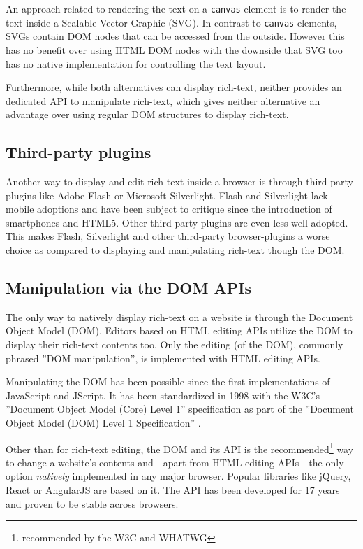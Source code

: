 An approach related to rendering the text on a \texttt{canvas} element is to render the text inside a Scalable Vector Graphic (SVG). In contrast to \texttt{canvas} elements, SVGs contain DOM nodes that can be accessed from the outside. However this has no benefit over using HTML DOM nodes with the downside that SVG too has no native implementation for controlling the text layout.

Furthermore, while both alternatives can display rich-text, neither provides an dedicated API to manipulate rich-text, which gives neither alternative an advantage over using regular DOM structures to display rich-text.

\subsection{Third-party plugins}

Another way to display and edit rich-text inside a browser is through third-party plugins like Adobe Flash or Microsoft Silverlight. Flash and Silverlight lack mobile adoptions and have been subject to critique since the introduction of smartphones and HTML5. Other third-party plugins are even less well adopted. This makes Flash, Silverlight and other third-party browser-plugins a worse choice as compared to displaying and manipulating rich-text though the DOM.

\subsection{Manipulation via the DOM APIs}
\label{subsec:manip_via_dom}

The only way to natively display rich-text on a website is through the Document Object Model (DOM). Editors based on HTML editing APIs utilize the DOM to display their rich-text contents too. Only the editing (of the DOM), commonly phrased ''DOM manipulation'', is implemented with HTML editing APIs.


Manipulating the DOM has been possible since the first implementations of JavaScript and JScript. It has been standardized in 1998 with the W3C's ''Document Object Model (Core) Level 1'' specification as part of the ''Document Object Model (DOM) Level 1 Specification'' \cite{DOM1}.


Other than for rich-text editing, the DOM and its API is the recommended\footnote{recommended by the W3C and WHATWG} way to change a website's contents and---apart from HTML editing APIs---the only option \textit{natively} implemented in any major browser. Popular libraries like jQuery, React or AngularJS are based on it. The API has been developed for 17 years and proven to be stable across browsers. 

